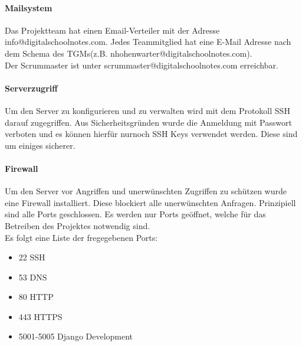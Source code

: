 \paragraph{Mailsystem}
Das Projektteam hat einen Email-Verteiler mit der Adresse info@digitalschoolnotes.com. Jedes Teammitglied hat eine E-Mail Adresse nach dem Schema des \gls{TGM}s(z.B. nhohenwarter@digitalschoolnotes.com). \\
Der Scrummaster ist unter scrummaster@digitalschoolnotes.com erreichbar.

\paragraph{Serverzugriff}
Um den Server zu konfigurieren und zu verwalten wird mit dem Protokoll \gls{SSH} darauf zugegriffen. Aus Sicherheitsgründen wurde die Anmeldung mit Passwort verboten und es können hierfür nurnoch SSH Keys verwendet werden. Diese sind um einiges sicherer.

\paragraph{Firewall}
Um den Server vor Angriffen und unerwünschten Zugriffen zu schützen wurde eine Firewall installiert. Diese blockiert alle unerwünschten Anfragen. Prinzipiell sind alle Ports geschlossen. Es werden nur Ports geöffnet, welche für das Betreiben des Projektes notwendig sind.\\
Es folgt eine Liste der fregegebenen Ports:
\begin{itemize}
\item 22	SSH
\item 53	\gls{DNS}
\item 80	\gls{HTTP}
\item 443	\gls{HTTPS}
\item 5001-5005 Django Development
\end{itemize}

